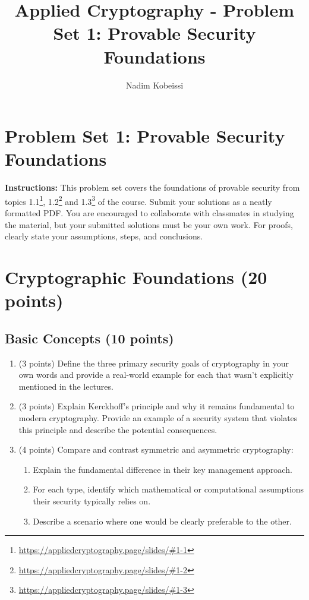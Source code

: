 \documentclass[10pt,a4paper,american]{exam}
\title{Applied Cryptography - Problem Set 1: Provable Security Foundations}
\author{Nadim Kobeissi}
\begin{document}
\classhandoutheader
\section*{Problem Set 1: Provable Security Foundations}

\begin{tcolorbox}[colframe=OliveGreen!30!white,colback=OliveGreen!5!white]
	\textbf{Instructions:} This problem set covers the foundations of provable security from topics 1.1\footnote{\url{https://appliedcryptography.page/slides/\#1-1}}, 1.2\footnote{\url{https://appliedcryptography.page/slides/\#1-2}} and 1.3\footnote{\url{https://appliedcryptography.page/slides/\#1-3}} of the course. Submit your solutions as a neatly formatted PDF. You are encouraged to collaborate with classmates in studying the material, but your submitted solutions must be your own work. For proofs, clearly state your assumptions, steps, and conclusions.
\end{tcolorbox}

\section{Cryptographic Foundations (20 points)}

\subsection{Basic Concepts (10 points)}

\begin{enumerate}
	\item (3 points) Define the three primary security goals of cryptography in your own words and provide a real-world example for each that wasn't explicitly mentioned in the lectures.

	\item (3 points) Explain Kerckhoff's principle and why it remains fundamental to modern cryptography. Provide an example of a security system that violates this principle and describe the potential consequences.

	\item (4 points) Compare and contrast symmetric and asymmetric cryptography:
	      \begin{enumerate}
		      \item Explain the fundamental difference in their key management approach.
		      \item For each type, identify which mathematical or computational assumptions their security typically relies on.
		      \item Describe a scenario where one would be clearly preferable to the other.
	      \end{enumerate}
\end{enumerate}
\end{document}
